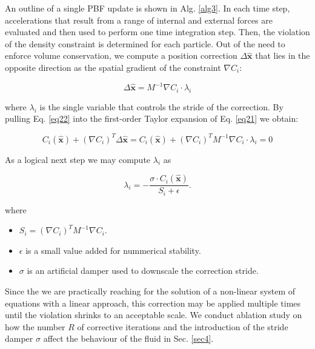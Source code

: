 \documentclass[
	11pt, 
	DIV10,
	ngerman,
	a4paper, 
	oneside, 
	headings=normal, 
	captions=tableheading,
	final, 
	numbers=noenddot
]{scrartcl}
\begin{document}
An outline of a single PBF update is shown in Alg. \ref{alg3}. In each time step, accelerations that result from a range of internal and external forces are evaluated and then used to perform one time integration step. Then, the violation of the density constraint is determined for each particle. Out of the need to enforce volume conservation, we compute a position correction $ \Delta \hat{\boldsymbol{x}} $ that lies in the opposite direction as the spatial gradient of the constraint $ \nabla C_{i} $:

\begin{equation}
	\label{eq22}
	\Delta \hat{\boldsymbol{x}} = M^{-1} \nabla C_{i} \cdot \lambda_{i}
\end{equation}

where $ \lambda_{i} $ is the single variable that controls the stride of the correction. By pulling Eq. \eqref{eq22} into the first-order Taylor expansion of Eq. \eqref{eq21} we obtain:

\begin{equation}
	\label{eq23}
	C_{i}(\hat{\boldsymbol{x}}) + (\nabla C_{i})^{T} \Delta \hat{\boldsymbol{x}} = C_{i}(\hat{\boldsymbol{x}}) + (\nabla C_{i})^{T} M^{-1} \nabla C_{i} \cdot \lambda_{i} = 0
\end{equation}

As a logical next step we may compute $ \lambda_{i} $ as

\begin{equation}
	\label{eq24}
	\lambda_{i} = - \frac{\sigma \cdot C_{i}(\hat{\boldsymbol{x}})}{S_{i} + \epsilon}.
\end{equation}

where

\begin{itemize}
    \item $ S_{i} = (\nabla C_{i})^{T} M^{-1} \nabla C_{i} $.
    \item $ \epsilon $ is a small value added for nummerical stability.
    \item $ \sigma $ is an artificial damper used to downscale the correction stride.
\end{itemize}

Since the we are practically reaching for the solution of a non-linear system of equations with a linear approach, this correction may be applied multiple times until the violation shrinks to an acceptable scale. We conduct ablation study on how the number $ R $ of corrective iterations and the introduction of the stride damper $ \sigma $ affect the behaviour of the fluid in Sec. \ref{sec4}.
\end{document}
